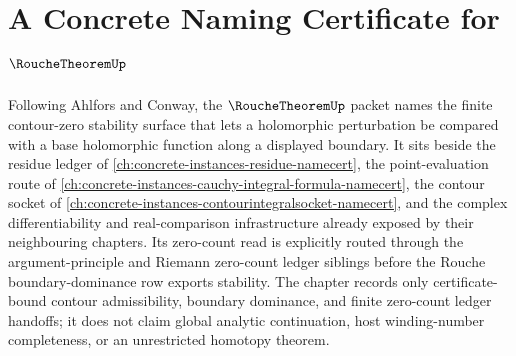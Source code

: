 \chapter{A Concrete Naming Certificate for $\RoucheTheoremUp$}
\label{ch:concrete-instances-rouche-theorem-namecert}

Following Ahlfors and Conway, the $\RoucheTheoremUp$ packet names the finite contour-zero stability surface that lets a holomorphic perturbation be compared with a base holomorphic function along a displayed boundary. It sits beside the residue ledger of \autoref{ch:concrete-instances-residue-namecert}, the point-evaluation route of \autoref{ch:concrete-instances-cauchy-integral-formula-namecert}, the contour socket of \autoref{ch:concrete-instances-contourintegralsocket-namecert}, and the complex differentiability and real-comparison infrastructure already exposed by their neighbouring chapters. Its zero-count read is explicitly routed through the argument-principle and Riemann zero-count ledger siblings before the Rouche boundary-dominance row exports stability. The chapter records only certificate-bound contour admissibility, boundary dominance, and finite zero-count ledger handoffs; it does not claim global analytic continuation, host winding-number completeness, or an unrestricted homotopy theorem.

